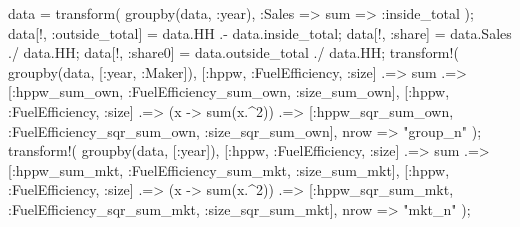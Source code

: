 \documentclass[
  letterpaper,
  DIV=11,
  numbers=noendperiod]{scrreprt}
\newenvironment{Shaded}{\begin{snugshade}}{\end{snugshade}}
\newcommand{\FloatTok}[1]{\textcolor[rgb]{0.68,0.00,0.00}{#1}}
\newcommand{\FunctionTok}[1]{\textcolor[rgb]{0.28,0.35,0.67}{#1}}
\newcommand{\NormalTok}[1]{\textcolor[rgb]{0.00,0.23,0.31}{#1}}
\newcommand{\OperatorTok}[1]{\textcolor[rgb]{0.37,0.37,0.37}{#1}}
\newcommand{\StringTok}[1]{\textcolor[rgb]{0.13,0.47,0.30}{#1}}
\begin{document}
\begin{Shaded}
\begin{Highlighting}[]
\NormalTok{data }\OperatorTok{=} \FunctionTok{transform}\NormalTok{(}
    \FunctionTok{groupby}\NormalTok{(data, }\OperatorTok{:}\NormalTok{year),}
    \OperatorTok{:}\NormalTok{Sales }\OperatorTok{=\textgreater{}}\NormalTok{ sum }\OperatorTok{=\textgreater{}} \OperatorTok{:}\NormalTok{inside\_total}
\NormalTok{);}
\NormalTok{data[!, }\OperatorTok{:}\NormalTok{outside\_total] }\OperatorTok{=}\NormalTok{ data.HH }\OperatorTok{.{-}}\NormalTok{ data.inside\_total;}
\NormalTok{data[!, }\OperatorTok{:}\NormalTok{share] }\OperatorTok{=}\NormalTok{ data.Sales }\OperatorTok{./}\NormalTok{ data.HH;}
\NormalTok{data[!, }\OperatorTok{:}\NormalTok{share0] }\OperatorTok{=}\NormalTok{ data.outside\_total }\OperatorTok{./}\NormalTok{ data.HH;}
\FunctionTok{transform!}\NormalTok{(}
    \FunctionTok{groupby}\NormalTok{(data, [}\OperatorTok{:}\NormalTok{year, }\OperatorTok{:}\NormalTok{Maker]),}
\NormalTok{    [}\OperatorTok{:}\NormalTok{hppw, }\OperatorTok{:}\NormalTok{FuelEfficiency, }\OperatorTok{:}\NormalTok{size] }\OperatorTok{.=\textgreater{}}\NormalTok{ sum }\OperatorTok{.=\textgreater{}}\NormalTok{ [}\OperatorTok{:}\NormalTok{hppw\_sum\_own, }\OperatorTok{:}\NormalTok{FuelEfficiency\_sum\_own, }\OperatorTok{:}\NormalTok{size\_sum\_own],}
\NormalTok{    [}\OperatorTok{:}\NormalTok{hppw, }\OperatorTok{:}\NormalTok{FuelEfficiency, }\OperatorTok{:}\NormalTok{size] }\OperatorTok{.=\textgreater{}}\NormalTok{ (x }\OperatorTok{{-}\textgreater{}} \FunctionTok{sum}\NormalTok{(x}\OperatorTok{.\^{}}\FloatTok{2}\NormalTok{)) }\OperatorTok{.=\textgreater{}}\NormalTok{ [}\OperatorTok{:}\NormalTok{hppw\_sqr\_sum\_own, }\OperatorTok{:}\NormalTok{FuelEfficiency\_sqr\_sum\_own, }\OperatorTok{:}\NormalTok{size\_sqr\_sum\_own],}
\NormalTok{    nrow }\OperatorTok{=\textgreater{}} \StringTok{"group\_n"}
\NormalTok{);}
\FunctionTok{transform!}\NormalTok{(}
    \FunctionTok{groupby}\NormalTok{(data, [}\OperatorTok{:}\NormalTok{year]),}
\NormalTok{    [}\OperatorTok{:}\NormalTok{hppw, }\OperatorTok{:}\NormalTok{FuelEfficiency, }\OperatorTok{:}\NormalTok{size] }\OperatorTok{.=\textgreater{}}\NormalTok{ sum }\OperatorTok{.=\textgreater{}}\NormalTok{ [}\OperatorTok{:}\NormalTok{hppw\_sum\_mkt, }\OperatorTok{:}\NormalTok{FuelEfficiency\_sum\_mkt, }\OperatorTok{:}\NormalTok{size\_sum\_mkt],}
\NormalTok{    [}\OperatorTok{:}\NormalTok{hppw, }\OperatorTok{:}\NormalTok{FuelEfficiency, }\OperatorTok{:}\NormalTok{size] }\OperatorTok{.=\textgreater{}}\NormalTok{ (x }\OperatorTok{{-}\textgreater{}} \FunctionTok{sum}\NormalTok{(x}\OperatorTok{.\^{}}\FloatTok{2}\NormalTok{)) }\OperatorTok{.=\textgreater{}}\NormalTok{ [}\OperatorTok{:}\NormalTok{hppw\_sqr\_sum\_mkt, }\OperatorTok{:}\NormalTok{FuelEfficiency\_sqr\_sum\_mkt, }\OperatorTok{:}\NormalTok{size\_sqr\_sum\_mkt],}
\NormalTok{    nrow }\OperatorTok{=\textgreater{}} \StringTok{"mkt\_n"}
\NormalTok{);}


\end{Highlighting}
\end{Shaded}
\end{document}
